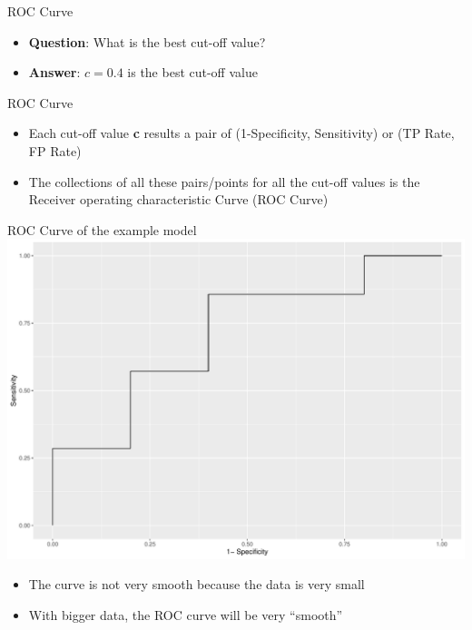 \documentclass[
  ignorenonframetext,
]{beamer}
\providecommand{\tightlist}{%
  \setlength{\itemsep}{0pt}\setlength{\parskip}{0pt}}
\begin{document}
\begin{frame}{ROC Curve}
\protect\hypertarget{roc-curve}{}
\begin{itemize}
\tightlist
\item
  \textbf{Question}: What is the best cut-off value?
\item
  \textbf{Answer}: \(c = 0.4\) is the best cut-off value
\end{itemize}
\end{frame}

\begin{frame}{ROC Curve}
\protect\hypertarget{roc-curve-1}{}
\begin{itemize}
\tightlist
\item
  Each cut-off value \textbf{c} results a pair of (1-Specificity,
  Sensitivity) or (TP Rate, FP Rate)
\item
  The collections of all these pairs/points for all the cut-off values
  is the Receiver operating characteristic Curve (ROC Curve)
\end{itemize}
\end{frame}

\begin{frame}{ROC Curve of the example model}
\protect\hypertarget{roc-curve-of-the-example-model}{}
\includegraphics{measuring_performance_files/figure-beamer/unnamed-chunk-5-1.pdf}

\begin{itemize}
\tightlist
\item
  The curve is not very smooth because the data is very small
\item
  With bigger data, the ROC curve will be very ``smooth''
\end{itemize}
\end{frame}
\end{document}
